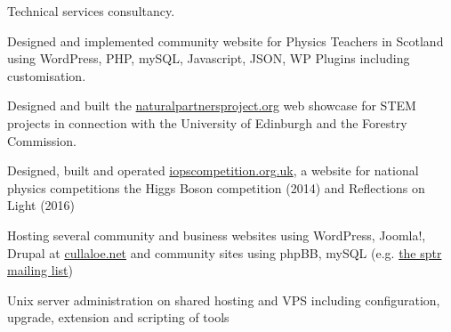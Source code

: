 \documentclass[10pt]{article}
\newenvironment{outerlist}[1][\enskip\textbullet]%
        {\begin{itemize}[#1]}{\end{itemize}%
         \vspace{-.6\baselineskip}}
\newenvironment{innerlist}[1][\enskip\textbullet]%
        {\begin{compactitem}[#1]}{\end{compactitem}}
\begin{document}
\begin{outerlist}
\item[]Technical services consultancy.

\begin{innerlist}
	\item Designed and implemented community website for Physics Teachers in Scotland using WordPress, PHP, mySQL, Javascript, JSON, WP Plugins including customisation.
	\item Designed and built the \href{http://naturalpartnersproject.org/}{naturalpartnersproject.org} web showcase for STEM projects in connection with the University of Edinburgh and the Forestry Commission.
	\item Designed, built and operated \href{http://iopscompetition.org.uk/}{iopscompetition.org.uk}, a website for national physics competitions the Higgs Boson competition (2014) and Reflections on Light (2016)
	\item Hosting several community and business websites using WordPress, Joomla!, Drupal at \href{http://cullaloe.net}{cullaloe.net} and community sites using phpBB, mySQL (e.g. \href{http://lists.sptr.net/mailman/listinfo}{the sptr mailing list})
	\item Unix server administration on shared hosting and VPS including configuration, upgrade, extension and scripting of tools
\end{innerlist}
\end{outerlist}
%
\end{document}

